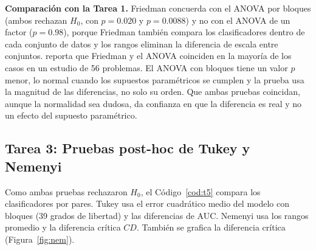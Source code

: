 \documentclass[11pt,letterpaper]{article}
\begin{document}
\textbf{Comparación con la Tarea 1.} Friedman concuerda con el ANOVA por bloques (ambos rechazan $H_0$, con $p = 0.020$ y $p = 0.0088$) y no con el ANOVA de un factor ($p = 0.98$), porque Friedman también compara los clasificadores dentro de cada conjunto de datos y los rangos eliminan la diferencia de escala entre conjuntos. \textcite{demsar2006} reporta que Friedman y el ANOVA coinciden en la mayoría de los casos en un estudio de 56 problemas. El ANOVA con bloques tiene un valor $p$ menor, lo normal cuando los supuestos paramétricos se cumplen y la prueba usa la magnitud de las diferencias, no solo su orden. Que ambas pruebas coincidan, aunque la normalidad sea dudosa, da confianza en que la diferencia es real y no un efecto del supuesto paramétrico.

\subsection{Tarea 3: Pruebas post-hoc de Tukey y Nemenyi}

Como ambas pruebas rechazaron $H_0$, el Código~\ref{cod:t5} compara los clasificadores por pares. Tukey usa el error cuadrático medio del modelo con bloques (39 grados de libertad) y las diferencias de AUC. Nemenyi usa los rangos promedio y la diferencia crítica $CD$. También se grafica la diferencia crítica (Figura~\ref{fig:nem}).
\end{document}
